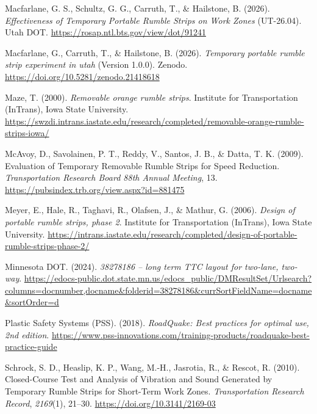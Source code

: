 \documentclass[
  letterpaper,
]{trb}
\newlength{\cslhangindent}
\newenvironment{CSLReferences}[2] %
 {\begin{list}{}{%
  \setlength{\itemindent}{0pt}
  \setlength{\leftmargin}{0pt}
  \setlength{\parsep}{0pt}
  \ifodd #1
   \setlength{\leftmargin}{\cslhangindent}
   \setlength{\itemindent}{-1\cslhangindent}
  \fi
  \setlength{\itemsep}{#2\baselineskip}}}
 {\end{list}}
\begin{document}
\begin{CSLReferences}{1}{0}
Macfarlane, G. S., Schultz, G. G., Carruth, T., \& Hailstone, B. (2026).
\emph{Effectiveness of {Temporary Portable Rumble Strips} on {Work
Zones}} (UT-26.04). Utah DOT.
\url{https://rosap.ntl.bts.gov/view/dot/91241}

Macfarlane, G., Carruth, T., \& Hailstone, B. (2026). \emph{Temporary
portable rumble strip experiment in utah} (Version 1.0.0). Zenodo.
\url{https://doi.org/10.5281/zenodo.21418618}

Maze, T. (2000). \emph{Removable orange rumble strips}. Institute for
Transportation (InTrans), Iowa State University.
\url{https://swzdi.intrans.iastate.edu/research/completed/removable-orange-rumble-strips-iowa/}

McAvoy, D., Savolainen, P. T., Reddy, V., Santos, J. B., \& Datta, T. K.
(2009). Evaluation of {Temporary Removable Rumble Strips} for {Speed
Reduction}. \emph{Transportation {Research Board} 88th {Annual
Meeting}}, 13. \url{https://pubsindex.trb.org/view.aspx?id=881475}

Meyer, E., Hale, R., Taghavi, R., Olafsen, J., \& Mathur, G. (2006).
\emph{Design of portable rumble strips, phase 2}. Institute for
Transportation (InTrans), Iowa State University.
\url{https://intrans.iastate.edu/research/completed/design-of-portable-rumble-strips-phase-2/}

Minnesota DOT. (2024). \emph{38278186 -- long term TTC layout for
two-lane, two-way}.
\url{https://edocs-public.dot.state.mn.us/edocs_public/DMResultSet/Urlsearch?columns=docnumber,docname&folderid=38278186&currSortFieldName=docname&sortOrder=d}

Plastic Safety Systems (PSS). (2018). \emph{RoadQuake: Best practices
for optimal use, 2nd edition}.
\url{https://www.pss-innovations.com/training-products/roadquake-best-practice-guide}

Schrock, S. D., Heaslip, K. P., Wang, M.-H., Jasrotia, R., \& Rescot, R.
(2010). Closed-{Course Test} and {Analysis} of {Vibration} and {Sound
Generated} by {Temporary Rumble Strips} for {Short-Term Work Zones}.
\emph{Transportation Research Record}, \emph{2169}(1), 21--30.
\url{https://doi.org/10.3141/2169-03}


\end{CSLReferences}
\end{document}

